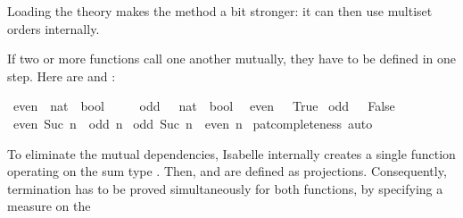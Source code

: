 \begin{isabellebody}
\begin{isamarkuptext}
  Loading the theory  makes the 
  method a bit stronger: it can then use multiset orders internally.%
\end{isamarkuptext}%
\isamarkuptrue%
%
\isamarkuptrue%
%
\begin{isamarkuptext}%
If two or more functions call one another mutually, they have to be defined
  in one step. Here are  and :%
\end{isamarkuptext}%
\isamarkuptrue%
\isamarkupfalse%
\ even\ {}{}\ {}nat\ {}\ bool{}\isanewline
\ \ \ \ \ odd\ \ {}{}\ {}nat\ {}\ bool{}\isanewline
{}\isanewline
\ \ {}even\ {}\ {}\ True{}\isanewline
{}\ {}odd\ {}\ {}\ False{}\isanewline
{}\ {}even\ {}Suc\ n{}\ {}\ odd\ n{}\isanewline
{}\ {}odd\ {}Suc\ n{}\ {}\ even\ n{}\isanewline
%
\isadelimproof
%
\endisadelimproof
%
\isatagproof
{}\isamarkupfalse%
\ pat{}completeness\ auto%
\endisatagproof
{\isafoldproof}%
%
\isadelimproof
%
\endisadelimproof
%
\begin{isamarkuptext}%
To eliminate the mutual dependencies, Isabelle internally
  creates a single function operating on the sum
  type . Then,  and  are
  defined as projections. Consequently, termination has to be proved
  simultaneously for both functions, by specifying a measure on the

\end{isamarkuptext}
\end{isabellebody}
